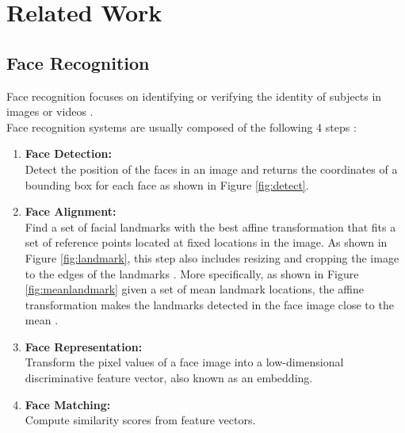 \documentclass[12pt,english]{article}
\begin{document}
\section{Related Work}	

\subsection{Face Recognition}

\quad 
Face recognition focuses on identifying or verifying the identity of subjects in images or videos \cite{trigueros}.\\

Face recognition systems are usually composed of the following 4 steps \cite{trigueros}: 

\begin{enumerate}
  \item \textbf{Face Detection:}\\ Detect the position of the faces in an image and returns the coordinates of a bounding box for each face as shown in Figure \ref{fig:detect}.
  \item \textbf{Face Alignment:} \\ Find a set of facial landmarks with the best affine transformation that fits a set of reference points located at fixed locations in the image. As shown in Figure \ref{fig:landmark}, this step also includes resizing and cropping the image to the edges of the landmarks \cite{amos}. More specifically, as shown in Figure \ref{fig:meanlandmark} given a set of mean landmark locations, the affine transformation makes the landmarks detected in the face image close to the mean \cite{amos}.
  
  \item \textbf{Face Representation:} \\ Transform the pixel values of a face image into a low-dimensional discriminative feature vector, also known as an embedding. 
  \item \textbf{Face Matching:} \\ Compute similarity scores from feature vectors.
\end{enumerate} 
 
\end{document}
